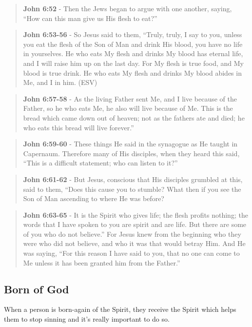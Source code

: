 \documentclass[11pt]{article}
\begin{document}
\begin{quote}
\textbf{John 6:52} - Then the Jews began to argue with one another, saying, “How can this man give us His flesh to eat?”
\end{quote}

\begin{quote}
\textbf{John 6:53-56} - So Jesus said to them, “Truly, truly, I say to you, unless you eat the flesh of the Son of Man and drink His blood, you have no life in yourselves. He who eats My flesh and drinks My blood has eternal life, and I will raise him up on the last day. For My flesh is true food, and My blood is true drink. He who eats My flesh and drinks My blood abides in Me, and I in him. (ESV)
\end{quote}

\begin{quote}
\textbf{John 6:57-58} - As the living Father sent Me, and I live because of the Father, so he who eats Me, he also will live because of Me. This is the bread which came down out of heaven; not as the fathers ate and died; he who eats this bread will live forever.”
\end{quote}

\begin{quote}
\textbf{John 6:59-60} - These things He said in the synagogue as He taught in Capernaum. Therefore many of His disciples, when they heard this said, “This is a difficult statement; who can listen to it?”
\end{quote}

\begin{quote}
\textbf{John 6:61-62} - But Jesus, conscious that His disciples grumbled at this, said to them, “Does this cause you to stumble? What then if you see the Son of Man ascending to where He was before?
\end{quote}

\begin{quote}
\textbf{John 6:63-65} - It is the Spirit who gives life; the flesh profits nothing; the words that I have spoken to you are spirit and are life. But there are some of you who do not believe.” For Jesus knew from the beginning who they were who did not believe, and who it was that would betray Him. And He was saying, “For this reason I have said to you, that no one can come to Me unless it has been granted him from the Father.”
\end{quote}

\subsection{Born of God}
\label{sec:org15cff4d}
When a person is born-again of the Spirit, they receive the Spirit which helps them to stop sinning and it's really important to do so.
\end{document}
